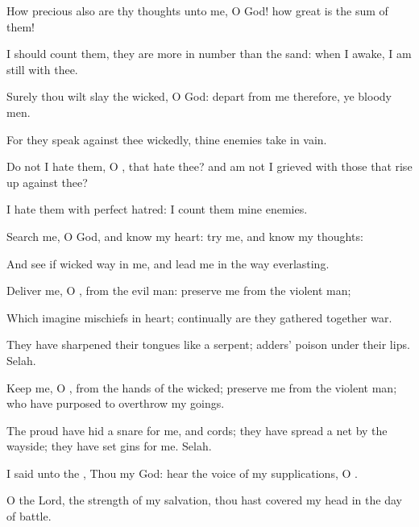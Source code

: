 {\Q {}How
precious also are thy
thoughts unto me, O
God! how
great is the
sum of them!


\par }{\Q {} I should
count them, they are more in
number than the
sand: when I
awake, I am
still with thee.


\par }{\Q {}Surely thou wilt
slay the
wicked, O
God:
depart from me therefore, ye
bloody
men.


\par }{\Q {}For they
speak against thee
wickedly,
{} thine
enemies
take
{} in
vain.


\par }{\Q {}Do not I
hate them, O
{}, that
hate thee? and am not I
grieved with those that rise
up against thee?


\par }{\Q {}I
hate them with
perfect
hatred: I count them mine
enemies.


\par }{\Q {}Search me, O
God, and
know my
heart:
try me, and
know my
thoughts:


\par }{\Q {}And
see if
{}
wicked
way in me, and
lead me in the
way
everlasting.




\par }
{\Q {}Deliver me, O
{}, from the
evil
man:
preserve me from the
violent
man;


\par }{\Q {}Which
imagine
mischiefs in
{}
heart;
continually are they gathered
together
{}
war.


\par }{\Q {}They have
sharpened their
tongues like a
serpent;
adders’
poison
{} under their
lips.
Selah.


\par }{\Q {}Keep me, O
{}, from the
hands of the
wicked;
preserve me from the
violent
man; who have
purposed to
overthrow my
goings.


\par }{\Q {}The
proud have
hid a
snare for me, and
cords; they have
spread a
net by the
wayside; they have
set
gins for me.
Selah.


\par }{\Q {}I
said unto the
{}, Thou
{} my
God:
hear the
voice of my
supplications, O
{}.


\par }{\Q {}O
{} the
Lord, the
strength of my
salvation, thou hast
covered my
head in the
day of
battle.


\par }{\BB \par }
